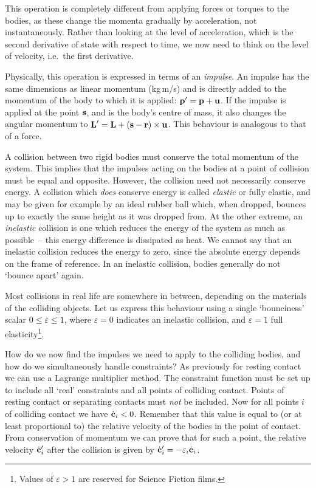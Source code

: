 This operation is completely different from applying forces or torques to the bodies, as these
change the momenta gradually by acceleration, not instantaneously. Rather than looking at the
level of acceleration, which is the second derivative of state with respect to time, we now need
to think on the level of velocity, i.e.\ the first derivative.

Physically, this operation is expressed in terms of an \emph{impulse}. An impulse  has the
same dimensions as linear momentum  (kg\,m/s) and is directly added to the momentum of the
body to which it is applied: $\ve{p}' = \ve{p} + \ve{u}$. If the impulse is applied at the point
$\ve{s}$, and  is the body's centre of mass, it also changes the angular momentum to
$\ve{L}' = \ve{L} + (\ve{s} - \ve{r})\times\ve{u}$. This behaviour is analogous to that of a
force.

A collision between two rigid bodies must conserve the total momentum of the system. This implies
that the impulses acting on the bodies at a point of collision must be equal and opposite. However,
the collision need not necessarily conserve energy. A collision which \emph{does} conserve energy
is called \emph{elastic} or fully elastic, and may be given for example by an ideal rubber ball
which, when dropped, bounces up to exactly the same height as it was dropped from. At the other
extreme, an \emph{inelastic} collision is one which reduces the energy of the system as much as
possible~-- this energy difference is dissipated as heat. We cannot say that an inelastic
collision reduces the energy to zero, since the absolute energy depends on the frame of reference.
In an inelastic collision, bodies generally do not `bounce apart' again.

Most collisions in real life are somewhere in between, depending on the materials of the colliding
objects. Let us express this behaviour using a single `bounciness' scalar
$0 \le \varepsilon \le 1$, where $\varepsilon = 0$ indicates an inelastic collision, and
$\varepsilon = 1$ full elasticity\footnote{Values of $\varepsilon > 1$ are reserved for Science
Fiction films.}.

How do we now find the impulses we need to apply to the colliding bodies, and how do we
simultaneously handle constraints? As previously for resting contact we can use a Lagrange
multiplier method. The constraint function  must be set up to include all `real' constraints
and all points of colliding contact. Points of resting contact or separating contacts must
\emph{not} be included. Now for all points $i$ of colliding contact we have $\dot{\ve{c}}_i < 0$.
Remember that this value is equal to (or at least proportional to) the relative velocity of the
bodies in the point of contact. From conservation of momentum we can prove that for such a point,
the relative velocity $\dot{\ve{c}}_i'$ after the collision is given by
$\dot{\ve{c}}_i' = -\varepsilon_i \dot{\ve{c}}_i$.

